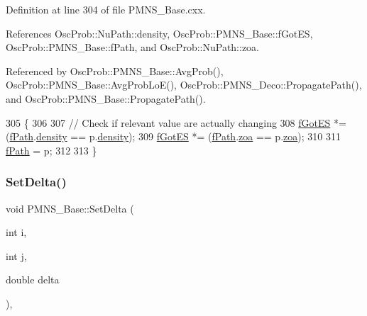 Definition at line 304 of file P\+M\+N\+S\+\_\+\+Base.\+cxx.



References Osc\+Prob\+::\+Nu\+Path\+::density, Osc\+Prob\+::\+P\+M\+N\+S\+\_\+\+Base\+::f\+Got\+ES, Osc\+Prob\+::\+P\+M\+N\+S\+\_\+\+Base\+::f\+Path, and Osc\+Prob\+::\+Nu\+Path\+::zoa.



Referenced by Osc\+Prob\+::\+P\+M\+N\+S\+\_\+\+Base\+::\+Avg\+Prob(), Osc\+Prob\+::\+P\+M\+N\+S\+\_\+\+Base\+::\+Avg\+Prob\+Lo\+E(), Osc\+Prob\+::\+P\+M\+N\+S\+\_\+\+Deco\+::\+Propagate\+Path(), and Osc\+Prob\+::\+P\+M\+N\+S\+\_\+\+Base\+::\+Propagate\+Path().


\begin{DoxyCode}
305 \{
306 
307   \textcolor{comment}{// Check if relevant value are actually changing}
308   \hyperlink{classOscProb_1_1PMNS__Base_a6dc5cd010d2d70b2324745b4e53e9839}{fGotES} *= (\hyperlink{classOscProb_1_1PMNS__Base_a849437aa8891fe042e86886ce8f81c6e}{fPath}.\hyperlink{structOscProb_1_1NuPath_a54ddd451db69bc54434de3cf18a117ca}{density} == p.\hyperlink{structOscProb_1_1NuPath_a54ddd451db69bc54434de3cf18a117ca}{density});
309   \hyperlink{classOscProb_1_1PMNS__Base_a6dc5cd010d2d70b2324745b4e53e9839}{fGotES} *= (\hyperlink{classOscProb_1_1PMNS__Base_a849437aa8891fe042e86886ce8f81c6e}{fPath}.\hyperlink{structOscProb_1_1NuPath_af3213f3691ba83c6bc05f4a3490f6b31}{zoa} == p.\hyperlink{structOscProb_1_1NuPath_af3213f3691ba83c6bc05f4a3490f6b31}{zoa});
310 
311   \hyperlink{classOscProb_1_1PMNS__Base_a849437aa8891fe042e86886ce8f81c6e}{fPath} = p;
312 
313 \}
\end{DoxyCode}
\mbox{\label{classOscProb_1_1PMNS__Base_a4bef78cfcfc4e70b4ce79cdb8862c0a3}} 
\subsubsection{\texorpdfstring{Set\+Delta()}{SetDelta()}}
{\footnotesize\ttfamily void P\+M\+N\+S\+\_\+\+Base\+::\+Set\+Delta (\begin{DoxyParamCaption}\item[{int}]{i,  }\item[{int}]{j,  }\item[{double}]{delta }\end{DoxyParamCaption})\hspace{0.3cm}{\ttfamily [virtual]}, {\ttfamily [inherited]}}

